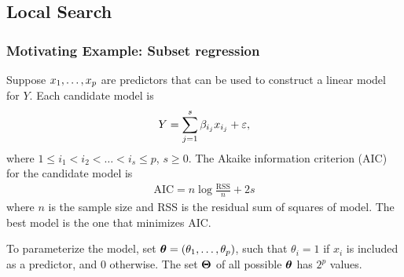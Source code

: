\subsection{Local Search}

\begin{frame}
  \frametitle{Motivating Example: Subset regression}
  Suppose ${x}_1, \ldots, {x}_{p}$ are predictors that can be used to construct a
  linear model for $Y$.  Each candidate model is
  \begin{align*}
    Y = \sum_{j=1}^s \beta_{i_j} x_{i_j} + \varepsilon,
  \end{align*}
  where $1\le i_1<i_2<\ldots<i_s\le p$, $s\ge 0$.  The Akaike
  information criterion (AIC) for the candidate model is
  \begin{align*}
    \text{AIC} = n \log\frac{\text{RSS}}{n} + 2s
  \end{align*}
  where $n$ is the sample size and RSS is the residual sum of
  squares of model.  The best model is the one that minimizes AIC.
  
  To parameterize the model, set $\boldsymbol{\theta}=({\theta}_1, \ldots, {\theta}_{p})$, such that $\theta_i=1$ if $x_i$ is included as a predictor,
  and 0 otherwise.  The set $\boldsymbol{\Theta}$ of all possible $\boldsymbol{\theta}$
  has $2^p$ values.
\end{frame}




